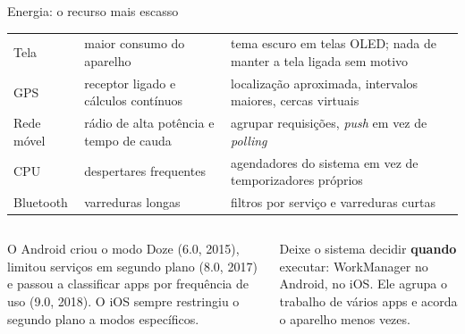 \begin{frame}{Energia: o recurso mais escasso}
  \scriptsize
  \begin{tabularx}{\textwidth}{@{}l L L@{}}
    \toprule
     &  &  \\
    \midrule
    Tela & maior consumo do aparelho & tema escuro em telas OLED; nada de manter a tela ligada sem motivo \\
    GPS & receptor ligado e cálculos contínuos & localização aproximada, intervalos maiores, cercas virtuais \\
    Rede móvel & rádio de alta potência e tempo de cauda & agrupar requisições, \emph{push} em vez de \emph{polling} \\
    CPU & despertares frequentes & agendadores do sistema em vez de temporizadores próprios \\
    Bluetooth & varreduras longas & filtros por serviço e varreduras curtas \\
    \bottomrule
  \end{tabularx}
  \normalsize
  \vspace{4pt}
  \begin{columns}[T]
    \begin{column}{0.49\textwidth}
      \begin{historia}
        O Android criou o modo Doze (6.0, 2015), limitou serviços em segundo plano (8.0, 2017) e passou a classificar apps por frequência de uso (9.0, 2018). O iOS sempre restringiu o segundo plano a modos específicos.
      \end{historia}
    \end{column}
    \begin{column}{0.49\textwidth}
      \begin{conceito}
        Deixe o sistema decidir \textbf{quando} executar: WorkManager no Android,  no iOS. Ele agrupa o trabalho de vários apps e acorda o aparelho menos vezes.
      \end{conceito}
    \end{column}
  \end{columns}
\end{frame}
